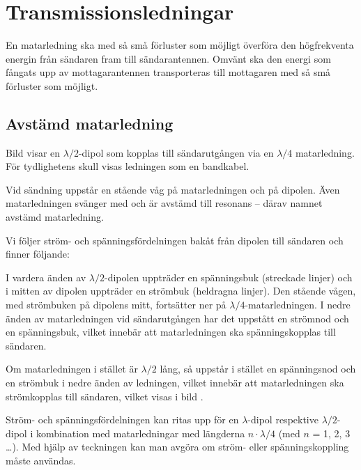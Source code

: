 \section{Transmissionsledningar}
\label{transmissionsledningar}

En matarledning ska med så små förluster som möjligt överföra den
högfrekventa energin från sändaren fram till sändarantennen.
Omvänt ska den energi som fångats upp av mottagarantennen transporteras
till mottagaren med så små förluster som möjligt.

\subsection{Avstämd matarledning}
\label{avstämd_matarledning}


Bild  visar en \(\lambda/2\)-dipol som kopplas till
sändarutgången via en \(\lambda/4\) matarledning.
För tydlighetens skull visas ledningen som en bandkabel.

Vid sändning uppstår en stående våg på matarledningen och på dipolen.
Även matarledningen svänger med och är avstämd till resonans
-- därav namnet avstämd matarledning.

Vi följer ström- och spänningsfördelningen bakåt från dipolen till
sändaren och finner följande:

I vardera änden av \(\lambda/2\)-dipolen uppträder en spänningsbuk (streckade
linjer) och i mitten av dipolen uppträder en strömbuk (heldragna linjer).
Den stående vågen, med strömbuken på dipolens mitt, fortsätter ner på
\(\lambda/4\)-matarledningen.
I nedre änden av matarledningen vid sändarutgången har det uppstått en strömnod
och en spänningsbuk, vilket innebär att matarledningen ska spänningskopplas
till sändaren.


Om matarledningen i stället är \(\lambda/2\) lång, så uppstår i
stället en spänningsnod och en strömbuk i nedre änden av ledningen,
vilket innebär att matarledningen ska strömkopplas till sändaren,
vilket visas i bild .

Ström- och spänningsfördelningen kan ritas upp för en \(\lambda\)-dipol
respektive \(\lambda/2\)-dipol i kombination med matarledningar med längderna
\(n \cdot \lambda/4\) (med \(n\) = 1, 2, 3 \dots).
Med hjälp av teckningen kan man avgöra om ström- eller spänningskoppling måste
användas.

